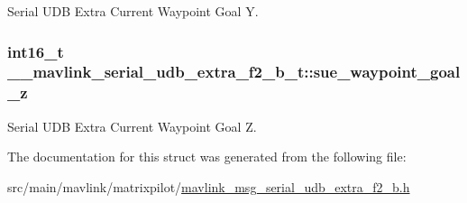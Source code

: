 Serial U\+D\+B Extra Current Waypoint Goal Y. 

\hypertarget{struct____mavlink__serial__udb__extra__f2__b__t_a060b4ad9a0823ca1bdfc6ec2583db2a8}{
\subsubsection[{sue\+\_\+waypoint\+\_\+goal\+\_\+z}]{\setlength{\rightskip}{0pt plus 5cm}int16\+\_\+t \+\_\+\+\_\+mavlink\+\_\+serial\+\_\+udb\+\_\+extra\+\_\+f2\+\_\+b\+\_\+t\+::sue\+\_\+waypoint\+\_\+goal\+\_\+z}}\label{struct____mavlink__serial__udb__extra__f2__b__t_a060b4ad9a0823ca1bdfc6ec2583db2a8}


Serial U\+D\+B Extra Current Waypoint Goal Z. 



The documentation for this struct was generated from the following file\+:\begin{DoxyCompactItemize}
\item 
src/main/mavlink/matrixpilot/\hyperlink{mavlink__msg__serial__udb__extra__f2__b_8h}{mavlink\+\_\+msg\+\_\+serial\+\_\+udb\+\_\+extra\+\_\+f2\+\_\+b.\+h}\end{DoxyCompactItemize}
